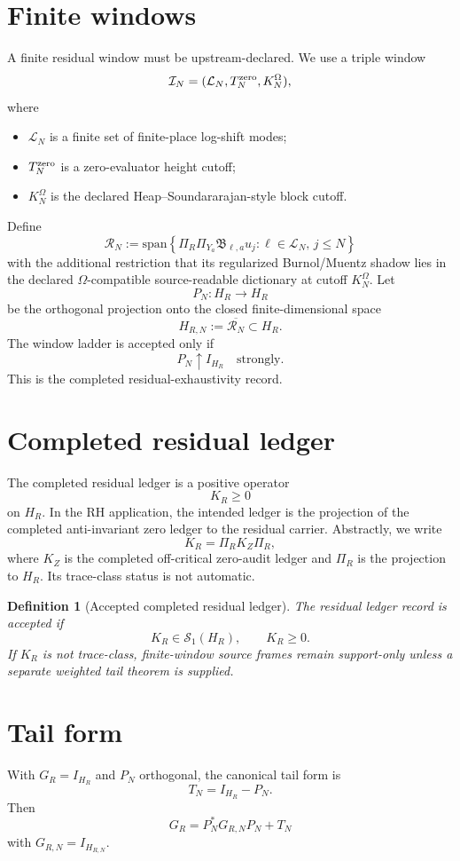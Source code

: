 \documentclass[11pt]{article}
\newtheorem{definition}{Definition}
\begin{document}
\section{Finite windows}
A finite residual window must be upstream-declared.  We use a triple window
\[
\mathcal I_N=(\mathcal L_N,T_N^{\rm zero},K_N^{\Omega}),
\]
where
\begin{itemize}[leftmargin=2em]
\item $\mathcal L_N$ is a finite set of finite-place log-shift modes;
\item $T_N^{\rm zero}$ is a zero-evaluator height cutoff;
\item $K_N^{\Omega}$ is the declared Heap--Soundararajan-style block cutoff.
\end{itemize}
Define
\[
\mathcal R_N:=\mathrm{span}\left\{
\Pi_R\Pi_{Y_a}\mathfrak B_{\ell,a}u_j:
\ell\in\mathcal L_N,
\,j\le N
\right\}
\]
with the additional restriction that its regularized Burnol/Muentz shadow lies in the declared $\Omega$-compatible source-readable dictionary at cutoff $K_N^{\Omega}$.  Let
\[
P_N:H_R\to H_R
\]
be the orthogonal projection onto the closed finite-dimensional space
\[
H_{R,N}:=\overline{\mathcal R_N}\subset H_R.
\]
The window ladder is accepted only if
\[
\boxed{P_N\uparrow I_{H_R}\quad\text{strongly}.}
\]
This is the completed residual-exhaustivity record.

\section{Completed residual ledger}
The completed residual ledger is a positive operator
\[
K_R\ge0
\]
on $H_R$.  In the RH application, the intended ledger is the projection of the completed anti-invariant zero ledger to the residual carrier.  Abstractly, we write
\[
K_R=\Pi_RK_Z\Pi_R,
\]
where $K_Z$ is the completed off-critical zero-audit ledger and $\Pi_R$ is the projection to $H_R$.  Its trace-class status is not automatic.

\begin{definition}[Accepted completed residual ledger]
The residual ledger record is accepted if
\[
\boxed{K_R\in\mathcal S_1(H_R),\qquad K_R\ge0.}
\]
If $K_R$ is not trace-class, finite-window source frames remain support-only unless a separate weighted tail theorem is supplied.
\end{definition}

\section{Tail form}
With $G_R=I_{H_R}$ and $P_N$ orthogonal, the canonical tail form is
\[
\boxed{T_N=I_{H_R}-P_N.}
\]
Then
\[
G_R=P_N^*G_{R,N}P_N+T_N
\]
with $G_{R,N}=I_{H_{R,N}}$.
\end{document}
